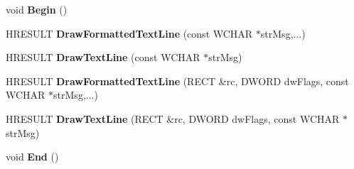 \begin{DoxyCompactItemize}
\item 
\hypertarget{class_c_d_x_u_t_text_helper_af89af0e0f1384754d03b5461f0d7f722}{void {\bfseries Begin} ()}\label{class_c_d_x_u_t_text_helper_af89af0e0f1384754d03b5461f0d7f722}

\item 
\hypertarget{class_c_d_x_u_t_text_helper_ac0a795044c9d27c5d2163af1f41423d4}{H\+R\+E\+S\+U\+L\+T {\bfseries Draw\+Formatted\+Text\+Line} (const W\+C\+H\+A\+R $\ast$str\+Msg,...)}\label{class_c_d_x_u_t_text_helper_ac0a795044c9d27c5d2163af1f41423d4}

\item 
\hypertarget{class_c_d_x_u_t_text_helper_a57d1d7b2fc521fd837f17647b4e2bec2}{H\+R\+E\+S\+U\+L\+T {\bfseries Draw\+Text\+Line} (const W\+C\+H\+A\+R $\ast$str\+Msg)}\label{class_c_d_x_u_t_text_helper_a57d1d7b2fc521fd837f17647b4e2bec2}

\item 
\hypertarget{class_c_d_x_u_t_text_helper_ad6d92ed3fe48d59442e33a4366830479}{H\+R\+E\+S\+U\+L\+T {\bfseries Draw\+Formatted\+Text\+Line} (R\+E\+C\+T \&rc, D\+W\+O\+R\+D dw\+Flags, const W\+C\+H\+A\+R $\ast$str\+Msg,...)}\label{class_c_d_x_u_t_text_helper_ad6d92ed3fe48d59442e33a4366830479}

\item 
\hypertarget{class_c_d_x_u_t_text_helper_ab0bfaac9948007694f0dbecfe8dc6aba}{H\+R\+E\+S\+U\+L\+T {\bfseries Draw\+Text\+Line} (R\+E\+C\+T \&rc, D\+W\+O\+R\+D dw\+Flags, const W\+C\+H\+A\+R $\ast$str\+Msg)}\label{class_c_d_x_u_t_text_helper_ab0bfaac9948007694f0dbecfe8dc6aba}

\item 
\hypertarget{class_c_d_x_u_t_text_helper_a505f277a35d77a60d475e10d18863852}{void {\bfseries End} ()}\label{class_c_d_x_u_t_text_helper_a505f277a35d77a60d475e10d18863852}

\end{DoxyCompactItemize}
